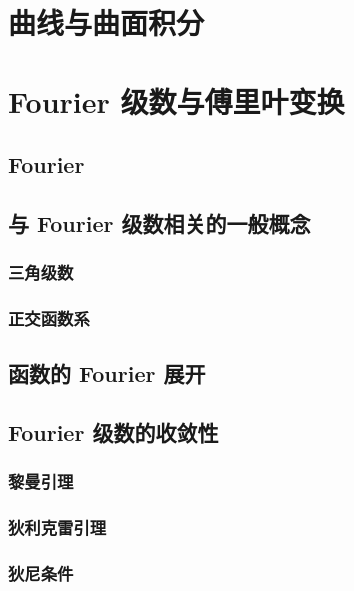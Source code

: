 \documentclass[cn,toc=twocol]{elegantbook}
\begin{document}
\chapter{曲线与曲面积分}



\chapter{Fourier 级数与傅里叶变换}

\section{Fourier}

\section{与 Fourier 级数相关的一般概念}

\subsection{三角级数}

\subsection{正交函数系}

\section{函数的 Fourier 展开}

\section{Fourier 级数的收敛性}

\subsection{黎曼引理}

\subsection{狄利克雷引理}

\subsection{狄尼条件}
\end{document}
